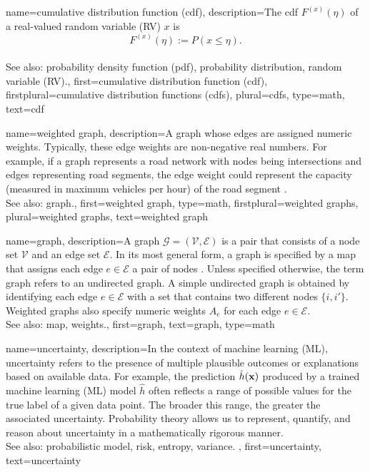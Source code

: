{
{name={cumulative distribution function (cdf)},
	description={The  cdf 
	$F^{(x)}\left(\eta\right)$ of a real-valued random variable (RV) $x$ is \cite{AshProbMeasure,papoulis}
	$$F^{(x)}\left(\eta\right) := P\left(x \leq \eta\right).$$
					\\ 
		See also: probability density function (pdf), probability distribution, random variable (RV).},
	first={cumulative distribution function (cdf)},
	firstplural={cumulative distribution functions (cdfs)}, 
	plural={cdfs}, 
	type=math,
	text={cdf} 
}

{name={weighted graph},
	description={A graph whose edges 
	are assigned numeric weights. Typically, these edge weights 
	are non-negative real numbers. For example, if a graph represents 
	a road network with nodes being intersections and edges representing 
	road segments, the edge weight could represent the capacity (measured 
	in maximum vehicles per hour) of the road segment \cite{NewmannBook}.  
					\\ 
		See also: graph.},
	first={weighted graph},
	type=math,
	firstplural={weighted graphs}, 
	plural={weighted graphs}, 
	text={weighted graph} 
}



{name={graph},
 description={A graph $\mathcal{G} = \left( \mathcal{V},\mathcal{E} \right)$ 
 is a pair that consists of a node set $\mathcal{V}$ and an edge set $\mathcal{E}$. 
 In its most general form, a graph is specified by a map that 
 assigns each edge $e \in \mathcal{E}$ a pair of nodes \cite{RockNetworks}. 
 Unless specified otherwise, the term graph refers to an undirected graph. 
 A simple undirected graph is obtained by identifying each edge $e \in \mathcal{E}$ 
 with a set that contains two different nodes $\{i,i'\}$. 
 Weighted graphs also specify numeric weights $A_{e}$ for each 
 edge $e \in \mathcal{E}$.
					\\ 
		See also: map, weights.},
 first={graph},
 text={graph}, 
 type=math
}

{name={uncertainty},
	description={In the context of machine learning (ML), uncertainty refers to the presence of multiple 
		plausible outcomes or explanations based on available data. For example, the 
		prediction $\hat{h}({\bf x})$ produced by a trained machine learning (ML) model $\hat{h}$
	 	often reflects a range of possible values for the true label of a given data point. 
	 	The broader this range, the greater the associated uncertainty. Probability theory 
	 	allows us to represent, quantify, and reason about uncertainty in a 
	 	mathematically rigorous manner.
					\\ 
		See also: probabilistic model, risk, entropy, variance. },
	first={uncertainty},
	text={uncertainty}
}

}
